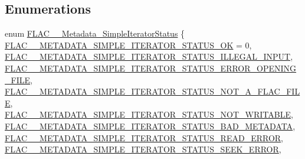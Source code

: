\subsection*{Enumerations}
\begin{DoxyCompactItemize}
\item 
enum \mbox{\hyperlink{group__flac__metadata__level1_gac926e7d2773a05066115cac9048bbec9}{F\+L\+A\+C\+\_\+\+\_\+\+Metadata\+\_\+\+Simple\+Iterator\+Status}} \{ \newline
\mbox{\hyperlink{group__flac__metadata__level1_ggac926e7d2773a05066115cac9048bbec9a33aadd73194c0d7e307d643237e0ddcd}{F\+L\+A\+C\+\_\+\+\_\+\+M\+E\+T\+A\+D\+A\+T\+A\+\_\+\+S\+I\+M\+P\+L\+E\+\_\+\+I\+T\+E\+R\+A\+T\+O\+R\+\_\+\+S\+T\+A\+T\+U\+S\+\_\+\+OK}} = 0, 
\mbox{\hyperlink{group__flac__metadata__level1_ggac926e7d2773a05066115cac9048bbec9a0a3933cb38c8957a8d5c3d1afb4766f9}{F\+L\+A\+C\+\_\+\+\_\+\+M\+E\+T\+A\+D\+A\+T\+A\+\_\+\+S\+I\+M\+P\+L\+E\+\_\+\+I\+T\+E\+R\+A\+T\+O\+R\+\_\+\+S\+T\+A\+T\+U\+S\+\_\+\+I\+L\+L\+E\+G\+A\+L\+\_\+\+I\+N\+P\+UT}}, 
\mbox{\hyperlink{group__flac__metadata__level1_ggac926e7d2773a05066115cac9048bbec9a20e835bbb74b4d039e598617f68d2af6}{F\+L\+A\+C\+\_\+\+\_\+\+M\+E\+T\+A\+D\+A\+T\+A\+\_\+\+S\+I\+M\+P\+L\+E\+\_\+\+I\+T\+E\+R\+A\+T\+O\+R\+\_\+\+S\+T\+A\+T\+U\+S\+\_\+\+E\+R\+R\+O\+R\+\_\+\+O\+P\+E\+N\+I\+N\+G\+\_\+\+F\+I\+LE}}, 
\mbox{\hyperlink{group__flac__metadata__level1_ggac926e7d2773a05066115cac9048bbec9a7785f77a612be8956fbe7cab73497220}{F\+L\+A\+C\+\_\+\+\_\+\+M\+E\+T\+A\+D\+A\+T\+A\+\_\+\+S\+I\+M\+P\+L\+E\+\_\+\+I\+T\+E\+R\+A\+T\+O\+R\+\_\+\+S\+T\+A\+T\+U\+S\+\_\+\+N\+O\+T\+\_\+\+A\+\_\+\+F\+L\+A\+C\+\_\+\+F\+I\+LE}}, 
\newline
\mbox{\hyperlink{group__flac__metadata__level1_ggac926e7d2773a05066115cac9048bbec9af055d8c0c663e72134fe2db8037b6880}{F\+L\+A\+C\+\_\+\+\_\+\+M\+E\+T\+A\+D\+A\+T\+A\+\_\+\+S\+I\+M\+P\+L\+E\+\_\+\+I\+T\+E\+R\+A\+T\+O\+R\+\_\+\+S\+T\+A\+T\+U\+S\+\_\+\+N\+O\+T\+\_\+\+W\+R\+I\+T\+A\+B\+LE}}, 
\mbox{\hyperlink{group__flac__metadata__level1_ggac926e7d2773a05066115cac9048bbec9a14c897124887858109200723826f85b7}{F\+L\+A\+C\+\_\+\+\_\+\+M\+E\+T\+A\+D\+A\+T\+A\+\_\+\+S\+I\+M\+P\+L\+E\+\_\+\+I\+T\+E\+R\+A\+T\+O\+R\+\_\+\+S\+T\+A\+T\+U\+S\+\_\+\+B\+A\+D\+\_\+\+M\+E\+T\+A\+D\+A\+TA}}, 
\mbox{\hyperlink{group__flac__metadata__level1_ggac926e7d2773a05066115cac9048bbec9a088df964f0852dd7e19304e920c3ee8e}{F\+L\+A\+C\+\_\+\+\_\+\+M\+E\+T\+A\+D\+A\+T\+A\+\_\+\+S\+I\+M\+P\+L\+E\+\_\+\+I\+T\+E\+R\+A\+T\+O\+R\+\_\+\+S\+T\+A\+T\+U\+S\+\_\+\+R\+E\+A\+D\+\_\+\+E\+R\+R\+OR}}, 
\mbox{\hyperlink{group__flac__metadata__level1_ggac926e7d2773a05066115cac9048bbec9a2ad85a32e291d1e918692d68cc22fd40}{F\+L\+A\+C\+\_\+\+\_\+\+M\+E\+T\+A\+D\+A\+T\+A\+\_\+\+S\+I\+M\+P\+L\+E\+\_\+\+I\+T\+E\+R\+A\+T\+O\+R\+\_\+\+S\+T\+A\+T\+U\+S\+\_\+\+S\+E\+E\+K\+\_\+\+E\+R\+R\+OR}}, 

\end{DoxyCompactItemize}
